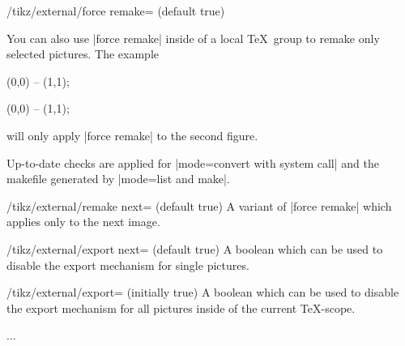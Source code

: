 {\begin{key}{/tikz/external/force remake= (default true)}
\begin{codeexample}
\tikzset{external/force remake}
\end{codeexample}
	You can also use |force remake| inside of a local \TeX\ group to remake only selected pictures. The example
\begin{codeexample}
\tikz \draw (0,0) -- (1,1);

{
\tikzset{external/force remake}
}

\tikz \draw (0,0) -- (1,1);
\end{codeexample}
	will only apply |force remake| to the second figure.

	Up-to-date checks are applied for |mode=convert with system call| and the makefile generated by |mode=list and make|.
\end{key}

\begin{key}{/tikz/external/remake next= (default true)}
	A variant of |force remake| which applies only to the next image.
\end{key}

\begin{key}{/tikz/external/export next= (default true)}
	A boolean which can be used to disable the export mechanism for single pictures.
\end{key}

\begin{key}{/tikz/external/export= (initially true)}
	A boolean which can be used to disable the export mechanism for all pictures inside of the current \TeX-scope. 

\begin{codeexample}


{
\tikzset{external/export=false}
...
} 



\end{codeexample}
\end{key}}
